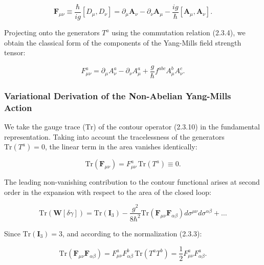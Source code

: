 \begin{equation}\label{eq:2.3.11}\tag{2.3.11}
\mathbf{F}_{\mu\nu} \equiv \frac{\hbar}{ig} \left[ D_\mu, D_\nu \right] = \partial_\mu \mathbf{A}_\nu - \partial_\nu \mathbf{A}_\mu - \frac{ig}{\hbar} \left[ \mathbf{A}_\mu, \mathbf{A}_\nu \right].
\end{equation}

Projecting onto the generators $T^a$ using the commutation relation (2.3.4), we obtain the classical form of the components of the Yang-Mills field strength tensor:

\begin{equation}\label{eq:2.3.12}\tag{2.3.12}
F_{\mu\nu}^a = \partial_\mu A_\nu^a - \partial_\nu A_\mu^a + \frac{g}{\hbar} f^{abc} A_\mu^b A_\nu^c.
\end{equation}

\subsubsection{Variational Derivation of the Non-Abelian Yang-Mills Action}\label{sec:2.3.3}

We take the gauge trace ($\text{Tr}$) of the contour operator (2.3.10) in the fundamental representation. Taking into account the tracelessness of the generators $\text{Tr}(T^a) = 0$, the linear term in the area vanishes identically:

\begin{equation}\label{eq:2.3.13}\tag{2.3.13}
\text{Tr}\left( \mathbf{F}_{\mu\nu} \right) = F_{\mu\nu}^a \, \text{Tr}(T^a) \equiv 0.
\end{equation}

The leading non-vanishing contribution to the contour functional arises at second order in the expansion with respect to the area of the closed loop:

\begin{equation}\label{eq:2.3.14}\tag{2.3.14}
\text{Tr}\left( \mathbf{W}[\delta\gamma] \right) = \text{Tr}(\mathbf{I}_3) - \frac{g^2}{8\hbar^2} \text{Tr}\left( \mathbf{F}_{\mu\nu} \mathbf{F}_{\alpha\beta} \right) d\sigma^{\mu\nu} d\sigma^{\alpha\beta} + \dots
\end{equation}

Since $\text{Tr}(\mathbf{I}_3) = 3$, and according to the normalization (2.3.3):

\begin{equation}\label{eq:2.3.15}\tag{2.3.15}
\text{Tr}\left( \mathbf{F}_{\mu\nu} \mathbf{F}_{\alpha\beta} \right) = F_{\mu\nu}^a F_{\alpha\beta}^b \, \text{Tr}(T^a T^b) = \frac{1}{2} F_{\mu\nu}^a F_{\alpha\beta}^a.
\end{equation}

